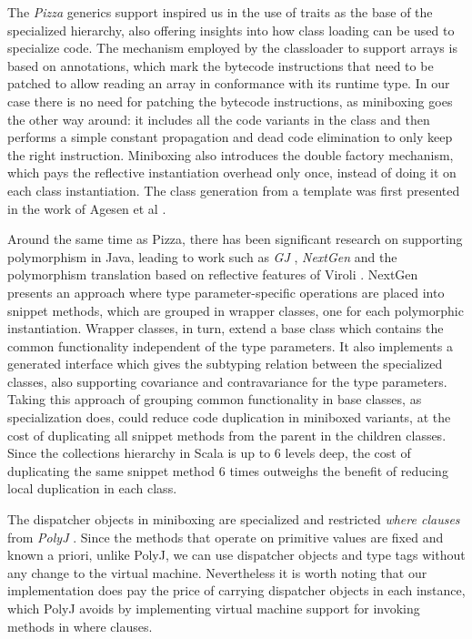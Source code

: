 The {\em Pizza} generics support \cite{pizza} inspired us in the use of traits as the base of the specialized hierarchy, also offering insights into how class loading can be used to specialize code. The mechanism employed by the classloader to support arrays is based on annotations, which mark the bytecode instructions that need to be patched to allow reading an array in conformance with its runtime type. In our case there is no need for patching the bytecode instructions, as miniboxing goes the other way around: it includes all the code variants in the class and then performs a simple constant propagation and dead code elimination to only keep the right instruction. Miniboxing also introduces the double factory mechanism, which pays the reflective instantiation overhead only once, instead of doing it on each class instantiation. The class generation from a template was first presented in the work of {Agesen et al} \cite{agesen-classloading}.

Around the same time as Pizza, there has been significant research on supporting polymorphism in Java, leading to work such as {\em GJ} \cite{java-erasure}, {\em NextGen} \cite{cartwright-nextgen} and the polymorphism translation based on reflective features of {Viroli} \cite{viroli-reflective}. NextGen \cite{cartwright-nextgen, allen-mixins, sasitorn-nextgen} presents an approach where type parameter-specific operations are placed into snippet methods, which are grouped in wrapper classes, one for each polymorphic instantiation. Wrapper classes, in turn, extend a base class which contains the common functionality independent of the type parameters. It also implements a generated interface which gives the subtyping relation between the specialized classes, also supporting covariance and contravariance for the type parameters. Taking this approach of grouping common functionality in base classes, as specialization does, could reduce code duplication in miniboxed variants, at the cost of duplicating all snippet methods from the parent in the children classes. Since the collections hierarchy in Scala is up to 6 levels deep, the cost of duplicating the same snippet method 6 times outweighs the benefit of reducing local duplication in each class.

The dispatcher objects in miniboxing are specialized and restricted {\em where clauses} from {\em PolyJ} \cite{myers-polyj}. Since the methods that operate on primitive values are fixed and known a priori, unlike PolyJ, we can use dispatcher objects and type tags without any change to the virtual machine. Nevertheless it is worth noting that our implementation does pay the price of carrying dispatcher objects in each instance, which PolyJ avoids by implementing virtual machine support for invoking methods in where clauses.

